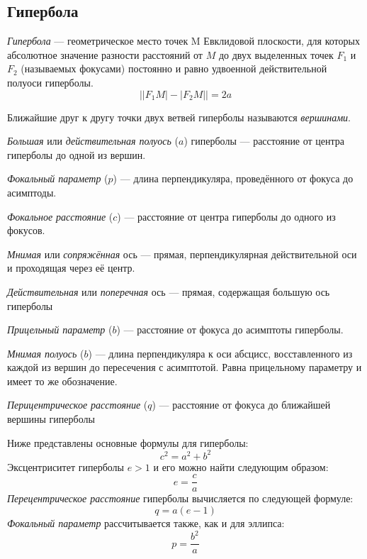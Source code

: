 \subsection{Гипербола}
 
\textit{Гипербола} --- геометрическое место точек M Евклидовой плоскости, для которых абсолютное значение разности расстояний от $M$ до двух выделенных точек $F_1$ и $F_2$ (называемых фокусами) постоянно и равно удвоенной действительной полуоси гиперболы.
\begin{equation}
\bigl||F_1M|-|F_2M|\bigr|=2a
\end{equation}

Ближайшие друг к другу точки двух ветвей гиперболы называются \textit{вершинами}.

\textit{Большая} или \textit{действительная полуось} ($a$) гиперболы --- расстояние от центра гиперболы до одной из вершин.

\textit{Фокальный параметр} ($p$) --- длина перпендикуляра, проведённого от фокуса до асимптоды.

\textit{Фокальное расстояние} ($c$) ---  расстояние от центра гиперболы до одного из фокусов.

\textit{Мнимая} или \textit{сопряжённая} ось --- прямая, перпендикулярная действительной оси и проходящая через её центр.

\textit{Действительная} или \textit{поперечная} ось ---  прямая, содержащая большую ось гиперболы

\textit{Прицельный параметр} ($b$) --- расстояние от фокуса до асимптоты гиперболы.

\textit{Мнимая полуось} ($b$) --- длина перпендикуляра к оси абсцисс, восставленного из каждой из вершин до пересечения с асимптотой. Равна прицельному параметру и имеет то же обозначение.

\textit{Перицентрическое расстояние} ($q$) --- расстояние от фокуса до ближайшей вершины гиперболы

Ниже представлены основные формулы для гиперболы:
\begin{equation}
c^2=a^2+b^2
\end{equation}
Эксцентриситет гиперболы $e>1$ и его можно найти следующим образом:
\begin{equation}
e=\frac{c}{a}
\end{equation}
\textit{Перецентрическое расстояние} гиперболы вычисляется по следующей формуле:
\begin{equation}
q=a(e-1)
\end{equation}
\textit{Фокальный параметр} рассчитывается также, как и для эллипса:
\begin{equation}
p=\frac{b^2}{a}
\end{equation}

